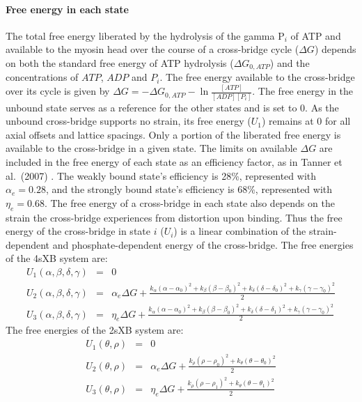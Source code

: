 \documentclass[10pt]{article}
\newcommand{\citep}[1]{\cite{#1}} %
\begin{document}
\paragraph{Free energy in each state} %
The total free energy liberated by the hydrolysis of the gamma P$_i$ of ATP and available to the myosin head over the course of a cross-bridge cycle ($\Delta G$) depends on both the standard free energy of ATP hydrolysis ($\Delta G_{0,ATP}$) and the concentrations of $ATP$, $ADP$ and $P_i$. 
The free energy available to the cross-bridge over its cycle is given by $\Delta G = -\Delta G_{0,ATP} - \ln \frac{[ATP]}{[ADP] [P_i]}$. 
The free energy in the unbound state serves as a reference for the other states and is set to 0. 
As the unbound cross-bridge supports no strain, its free energy ($U_1$) remains at 0 for all axial offsets and lattice spacings. 
Only a portion of the liberated free energy is available to the cross-bridge in a given state.
The limits on available $\Delta G$ are included in the free energy of each state as an efficiency factor, as in Tanner et al.~(2007) \citep{Pate1989, Tanner2007} .
The weakly bound state's efficiency is 28\%, represented with $\alpha_e=0.28$, and the strongly bound state's efficiency is 68\%, represented with $\eta_e=0.68$. 
The free energy of a cross-bridge in each state also depends on the strain the cross-bridge experiences from distortion upon binding.
Thus the free energy of the cross-bridge in state $i$ ($U_i$) is a linear combination of the strain-dependent and phosphate-dependent energy of the cross-bridge.
The free energies of the 4sXB system are: 
\begin{eqnarray}
\label{eq_4sEnergy}
U_1(\alpha, \beta, \delta, \gamma) & = & 0 \nonumber \\
U_2(\alpha, \beta, \delta, \gamma) & = & \alpha_e \Delta G + \frac{k_\alpha (\alpha-\alpha_0)^2 + k_\beta (\beta-\beta_0)^2 + k_\delta (\delta-\delta_0)^2 + k_\gamma (\gamma-\gamma_0)^2}{2} \\
U_3(\alpha, \beta, \delta, \gamma) & = & \eta_e \Delta G + \frac{k_\alpha (\alpha-\alpha_0)^2 + k_\beta (\beta-\beta_0)^2 + k_\delta (\delta-\delta_1)^2 + k_\gamma (\gamma-\gamma_0)^2}{2} \nonumber
\end{eqnarray}
The free energies of the 2sXB system are: 
\begin{eqnarray}
\label{eq_2sEnergy}
	U_1(\theta, \rho) & = & 0 \nonumber \\
    U_2(\theta, \rho) & = & \alpha_e \Delta G + \frac{k_\rho (\rho - \rho_0)^2 + 
                          k_\theta (\theta - \theta_0)^2}{2} \\
    U_3(\theta, \rho) & = & \eta_e \Delta G   + \frac{k_\rho (\rho - \rho_1)^2 + 
                          k_\theta (\theta - \theta_1)^2}{2} \nonumber 
\end{eqnarray}
\end{document}
